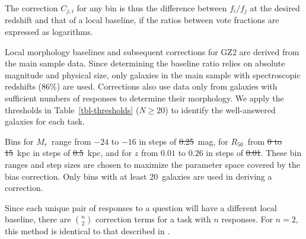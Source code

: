 \documentclass[useAMS,usenatbib]{mn2e}
\newcommand{\mr}{$M_r$}
\newcommand{\rfifty}{$R_{50}$}
\newcommand{\redshift}{$z$}
\providecommand{\DIFaddtex}[1]{{\protect\color{blue}\uwave{#1}}} %
\providecommand{\DIFdeltex}[1]{{\protect\color{red}\sout{#1}}}                      %
\providecommand{\DIFaddbegin}{} %
\providecommand{\DIFaddend}{} %
\providecommand{\DIFdelbegin}{} %
\providecommand{\DIFdelend}{} %
\providecommand{\DIFadd}[1]{\texorpdfstring{\DIFaddtex{#1}}{#1}} %
\providecommand{\DIFdel}[1]{\texorpdfstring{\DIFdeltex{#1}}{}} %
\begin{document}
\DIFdelbegin %
\DIFdelend The correction $C_{j,i}$ for any bin is thus the difference between $f_i/f_j$ at the desired redshift and that of a local baseline, if the ratios between vote fractions are expressed as logarithms.  

Local morphology baselines and subsequent corrections for GZ2 are derived from the main sample data. Since determining the baseline ratio relies on absolute magnitude and physical size, only galaxies in the main sample with spectroscopic redshifts (86\%) are used. Corrections also use data only from galaxies with sufficient numbers of responses to determine their morphology. We apply the thresholds in Table~\ref{tbl-thresholds} ($N\geq20$) to identify the well-answered galaxies for each task.

Bins for \mr~range from $-24$ to $-16$ in steps of \DIFdelbegin \DIFdel{0.25}\DIFdelend \DIFaddbegin \DIFadd{$0.25$}\DIFaddend ~mag, for \rfifty~from \DIFdelbegin \DIFdel{0 to 15}\DIFdelend \DIFaddbegin \DIFadd{$0$ to $15$}\DIFaddend ~kpc in steps of \DIFdelbegin \DIFdel{0.5}\DIFdelend \DIFaddbegin \DIFadd{$0.5$}\DIFaddend ~kpc, and for $z$ from $0.01$ to $0.26$ in steps of \DIFdelbegin \DIFdel{0.01}\DIFdelend \DIFaddbegin \DIFadd{$0.01$}\DIFaddend . These bin ranges and step sizes are chosen to maximize the parameter space covered by the bias correction. Only bins with at least 20~galaxies are used in deriving a correction. 

Since each unique pair of responses to a question will have a different local baseline, there are $\binom{n}{2}$ correction terms for a task with $n$ responses. For $n=2$, this method is identical to that described in \citet{bam09}. 
\end{document}

